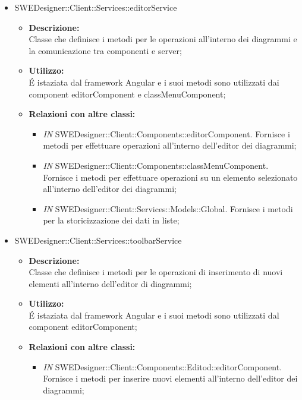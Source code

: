 \begin{itemize}
\begin{itemize}
		\item SWEDesigner::Client::Services::editorService
		\begin{itemize}
			\item \textbf{Descrizione:}\\
			Classe che definisce i metodi per le operazioni all'interno dei diagrammi e la comunicazione tra componenti e server;
			\item \textbf{Utilizzo:}\\
			É istaziata dal framework Angular e i suoi metodi sono utilizzati dai component editorComponent e classMenuComponent;
			\item \textbf{Relazioni con altre classi: }
			\begin{itemize}
			\item \emph{IN}  SWEDesigner::Client::Components::editorComponent. Fornisce i metodi per effettuare operazioni all'interno dell'editor dei diagrammi;
			\item \emph{IN}  SWEDesigner::Client::Components::classMenuComponent. Fornisce i metodi per effettuare operazioni su un elemento selezionato all'interno dell'editor dei diagrammi;
			\item \emph{IN}  SWEDesigner::Client::Services::Models::Global. Fornisce i metodi per la storicizzazione dei dati in liste;
			\end{itemize}
		\end{itemize}
		
		\item SWEDesigner::Client::Services::toolbarService
		\begin{itemize}
			\item \textbf{Descrizione:}\\
			Classe che definisce i metodi per le operazioni di inserimento di nuovi elementi all'interno dell'editor di diagrammi;
			\item \textbf{Utilizzo:}\\
			É istaziata dal framework Angular e i suoi metodi sono utilizzati dal component editorComponent;
			\item \textbf{Relazioni con altre classi: }
			\begin{itemize}
			\item \emph{IN}  SWEDesigner::Client::Components::Editod::editorComponent. Fornisce i metodi per inserire nuovi elementi all'interno dell'editor dei diagrammi;
			\end{itemize}
		\end{itemize}
		

\end{itemize}
\end{itemize}
